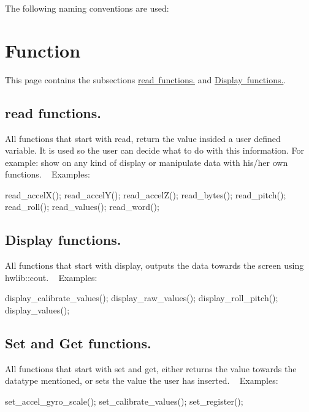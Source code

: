 The following naming conventions are used\+: \hypertarget{_page1_sec}{}\section{Function}\label{_page1_sec}
This page contains the subsections \mbox{\hyperlink{_page1_subsection1}{read functions.}} and \mbox{\hyperlink{_page1_subsection2}{Display functions.}}. \hypertarget{_page1_subsection1}{}\subsection{read functions.}\label{_page1_subsection1}
All functions that start with read, return the value insided a user defined variable. It is used so the user can decide what to do with this information. For example\+: show on any kind of display or manipulate data with his/her own functions. ~\newline
 Examples\+: 
\begin{DoxyCode}
read\_accelX();
read\_accelY();
read\_accelZ();
read\_bytes();
read\_pitch();
read\_roll();
read\_values();
read\_word();
\end{DoxyCode}
 \hypertarget{_page1_subsection2}{}\subsection{Display functions.}\label{_page1_subsection2}
All functions that start with display, outputs the data towards the screen using hwlib\+::cout. ~\newline
 Examples\+: 
\begin{DoxyCode}
display\_calibrate\_values();
display\_raw\_values();
display\_roll\_pitch();
display\_values();
\end{DoxyCode}
 \hypertarget{_page1_subsection3}{}\subsection{Set and Get functions.}\label{_page1_subsection3}
All functions that start with set and get, either returns the value towards the datatype mentioned, or sets the value the user has inserted. ~\newline
 Examples\+: 
\begin{DoxyCode}
set\_accel\_gyro\_scale();
set\_calibrate\_values();
set\_register();
\end{DoxyCode}
 